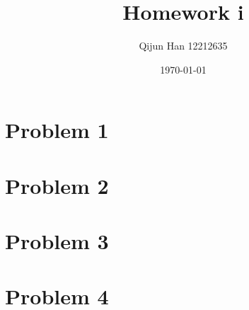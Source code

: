 \documentclass[12pt,a4paper]{article}
\title{Homework i}
\author{Qijun Han 12212635}
\date{\today}
\begin{document}
\maketitle

\section{Problem 1}

\section{Problem 2}

\section{Problem 3}

\section{Problem 4}
\end{document}
